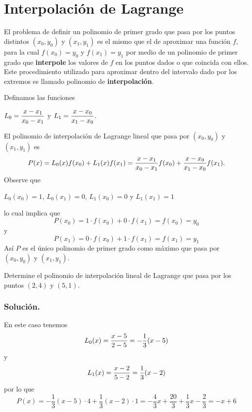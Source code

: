 
\section{Interpolación de Lagrange}
El problema de definir un polinomio de primer grado que pasa por los puntos distintos $(x_0, y_0)$ y $(x_1, y_1)$ es el mismo que el de 
aproximar una función $f$, para la cual $f(x_0) = y_0$ y $f(x_1) = y_1$ por medio de un polinomio de primer grado que \textbf{interpole} 
los valores de $f$ en los puntos dados o que coincida con ellos. Este procedimiento utilizado para aproximar dentro del intervalo dado 
por los extremos es llamado polinomio de \textbf{interpolación}.

Definamos las funciones 

\begin{center}
	$L_0 = \displaystyle{x - x_1\over x_0 - x_1}$ y $L_1 = \displaystyle{x - x_0\over x_1 - x_0}$.
\end{center}

El polinomio de interpolación de Lagrange lineal que pasa por $(x_0, y_0)$ y $(x_1, y_1)$ es
$$P(x) = L_0(x)f(x_0) + L_1(x)f(x_1) = {x - x_1\over x_0 - x_1}f(x_0) + {x - x_0\over x_1 - x_0}f(x_1).$$
Observe que

\begin{center}
	$L_0(x_0) = 1$, $L_0(x_1) = 0$, $L_1(x_0) = 0$ y $L_1(x_1) = 1$
\end{center}

lo cual implica que 
$$P(x_0) = 1\cdot f(x_0) + 0\cdot f(x_1) = f(x_0) = y_0$$
y
$$P(x_1) = 0\cdot f(x_0) + 1\cdot f(x_1) = f(x_1) = y_1$$
Así $P$ es el único polinomio de primer grado como máximo que pasa por $(x_0, y_0)$ y $(x_1, y_1)$.

\begin{example}{\rm 
	Determine el polinomio de interpolación lineal de Lagrange que pasa por los puntos $(2, 4)$ y $(5, 1)$.\\
	\subsubsection*{Solución.} En este caso tenemos
		$$L_0(x) = {x-5\over 2-5} = -\frac{1}{3}(x-5)$$	
		y
		$$L_1(x) = {x-2\over 5-2} = \frac{1}{3}(x-2)$$
		por lo que
		$$P(x) = -\frac{1}{3}(x-5)\cdot 4 + \frac{1}{3}(x-2)\cdot 1 = -\frac{4}{3}x + \frac{20}{3} + \frac{1}{3}x - \frac{2}{3} = -x + 6$$
}\end{example}

